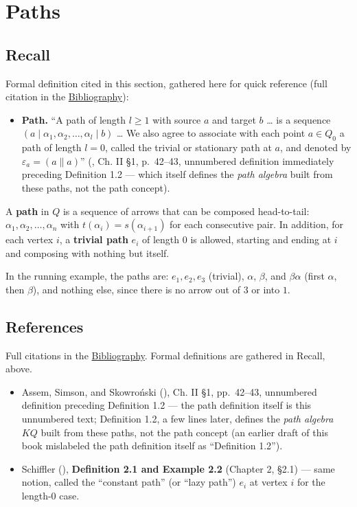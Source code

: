 \section{Paths}\label{sec:11-path-algebras:02-paths:1}

\subsection{Recall}\label{sec:11-path-algebras:02-paths:2}

Formal definition cited in this section, gathered here for quick reference (full citation in the \hyperref[sec:root:bibliography:1]{Bibliography}):

\begin{itemize}
\tightlist
\item
  \textbf{Path.} ``A path of length \(l \geq 1\) with source \(a\) and target \(b\) \ldots{} is a sequence \((a \mid \alpha_1, \alpha_2, \ldots, \alpha_l
  \mid b)\) \ldots{} We also agree to associate with each point \(a \in
  Q_0\) a path of length \(l = 0\), called the trivial or stationary path at \(a\), and denoted by \(\varepsilon_a = (a \| a)\)'' (\cite{AssemSimsonSkowronski2006}, Ch. II §1, p.~42--43, unnumbered definition immediately preceding Definition 1.2 --- which itself defines the \emph{path algebra} built from these paths, not the path concept).
\end{itemize}

A \textbf{path} in \(Q\) is a sequence of arrows that can be composed head-to-tail: \(\alpha_1, \alpha_2, \dots, \alpha_n\) with \(t(\alpha_i) = s(\alpha_{i+1})\) for each consecutive pair. In addition, for each vertex \(i\), a \textbf{trivial path} \(e_i\) of length \(0\) is allowed, starting and ending at \(i\) and composing with nothing but itself.

In the running example, the paths are: \(e_1, e_2, e_3\) (trivial), \(\alpha\), \(\beta\), and \(\beta\alpha\) (first \(\alpha\), then \(\beta\)), and nothing else, since there is no arrow out of \(3\) or into \(1\).

\subsection{References}\label{sec:11-path-algebras:02-paths:3}

Full citations in the \hyperref[sec:root:bibliography:1]{Bibliography}. Formal definitions are gathered in Recall, above.

\begin{itemize}
\tightlist
\item
  Assem, Simson, and Skowroński (\cite{AssemSimsonSkowronski2006}), Ch. II §1, pp.~42--43, unnumbered definition preceding Definition 1.2 --- the path definition itself is this unnumbered text; Definition 1.2, a few lines later, defines the \emph{path algebra} \(KQ\) built from these paths, not the path concept (an earlier draft of this book mislabeled the path definition itself as ``Definition 1.2'').
\item
  Schiffler (\cite{Schiffler2014}), \textbf{Definition 2.1 and Example 2.2} (Chapter 2, §2.1) --- same notion, called the ``constant path'' (or ``lazy path'') \(e_i\) at vertex \(i\) for the length-\(0\) case.
\end{itemize}
